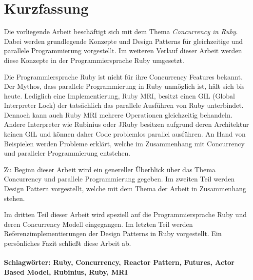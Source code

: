 \section*{Kurzfassung}
\vspace{0.5cm}

Die vorliegende Arbeit beschäftigt sich mit dem Thema \emph{Concurrency in Ruby}. Dabei werden grundlegende Konzepte und Design Patterns für gleichzeitige und parallele Programmierung vorgestellt. Im weiteren Verlauf dieser Arbeit werden diese Konzepte in der Programmiersprache Ruby umgesetzt. 

Die Programmiersprache Ruby ist nicht für ihre Concurrency Features bekannt. Der Mythos, dass parallele Programmierung in Ruby unmöglich ist, hält sich bis heute. Lediglich eine Implementierung, Ruby MRI, besitzt einen GIL (Global Interpreter Lock) der tatsächlich das parallele Ausführen von Ruby unterbindet. Dennoch kann auch Ruby MRI mehrere Operationen gleichzeitig behandeln. Andere Interpreter wie Rubinius oder JRuby besitzen aufgrund deren Architektur keinen GIL und können daher Code problemlos parallel ausführen. An Hand von Beispielen werden Probleme erklärt, welche im Zusammenhang mit Concurrency und paralleler Programmierung entstehen. 

Zu Beginn dieser Arbeit wird ein genereller Überblick über das Thema Concurrency und parallele Programmierung  gegeben. Im zweiten Teil werden Design Pattern vorgestellt, welche mit dem Thema der Arbeit in Zusammenhang stehen. 

Im dritten Teil dieser Arbeit wird speziell auf die Programmiersprache Ruby und deren Concurrency Modell eingegangen. Im letzten Teil werden Referenzimplementierungen der Design Patterns in Ruby vorgestellt. Ein persönliches Fazit schließt diese Arbeit ab.

\paragraph{Schlagwörter: Ruby, Concurrency, Reactor Pattern, Futures, Actor Based Model, Rubinius, Ruby, MRI}